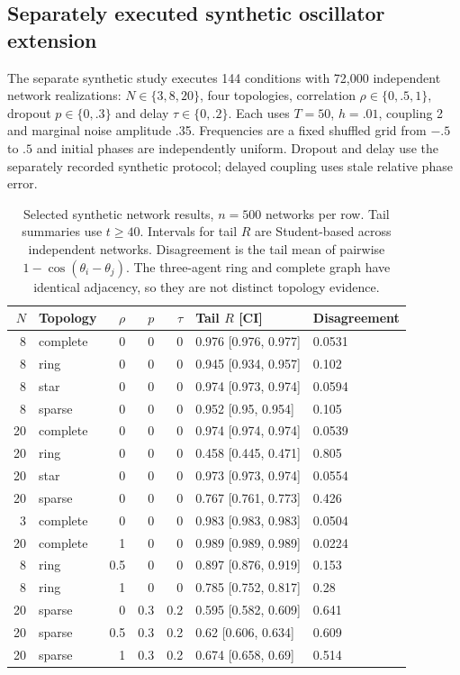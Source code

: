 \documentclass[11pt,a4paper]{article}
\begin{document}
\subsection{Separately executed synthetic oscillator extension}
The separate synthetic study executes 144 conditions with 72,000 independent network realizations: $N\in\{3,8,20\}$, four topologies, correlation $\rho\in\{0,.5,1\}$, dropout $p\in\{0,.3\}$ and delay $\tau\in\{0,.2\}$. Each uses $T=50$, $h=.01$, coupling 2 and marginal noise amplitude .35. Frequencies are a fixed shuffled grid from $-.5$ to $.5$ and initial phases are independently uniform. Dropout and delay use the separately recorded synthetic protocol; delayed coupling uses stale relative phase error.

\begin{table}[htbp]\centering\small
\setlength{\tabcolsep}{4pt}
\begin{tabular}{rlrrrll}\toprule
$N$ & Topology & $\rho$ & $p$ & $\tau$ & Tail $R$ [CI] & Disagreement \\ \midrule
8 & complete & 0 & 0 & 0 & 0.976 [0.976, 0.977] & 0.0531 \\
8 & ring & 0 & 0 & 0 & 0.945 [0.934, 0.957] & 0.102 \\
8 & star & 0 & 0 & 0 & 0.974 [0.973, 0.974] & 0.0594 \\
8 & sparse & 0 & 0 & 0 & 0.952 [0.95, 0.954] & 0.105 \\
20 & complete & 0 & 0 & 0 & 0.974 [0.974, 0.974] & 0.0539 \\
20 & ring & 0 & 0 & 0 & 0.458 [0.445, 0.471] & 0.805 \\
20 & star & 0 & 0 & 0 & 0.973 [0.973, 0.974] & 0.0554 \\
20 & sparse & 0 & 0 & 0 & 0.767 [0.761, 0.773] & 0.426 \\
3 & complete & 0 & 0 & 0 & 0.983 [0.983, 0.983] & 0.0504 \\
20 & complete & 1 & 0 & 0 & 0.989 [0.989, 0.989] & 0.0224 \\
8 & ring & 0.5 & 0 & 0 & 0.897 [0.876, 0.919] & 0.153 \\
8 & ring & 1 & 0 & 0 & 0.785 [0.752, 0.817] & 0.28 \\
20 & sparse & 0 & 0.3 & 0.2 & 0.595 [0.582, 0.609] & 0.641 \\
20 & sparse & 0.5 & 0.3 & 0.2 & 0.62 [0.606, 0.634] & 0.609 \\
20 & sparse & 1 & 0.3 & 0.2 & 0.674 [0.658, 0.69] & 0.514 \\
\bottomrule\end{tabular}
\caption{Selected synthetic network results, $n=500$ networks per row. Tail summaries use $t\ge40$. Intervals for tail $R$ are Student-based across independent networks. Disagreement is the tail mean of pairwise $1-\cos(\theta_i-\theta_j)$. The three-agent ring and complete graph have identical adjacency, so they are not distinct topology evidence.}
\label{tab:synthetic}
\end{table}
\end{document}
